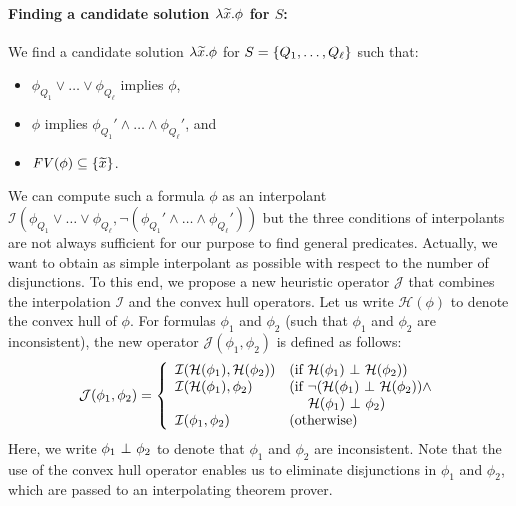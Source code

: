 \paragraph{Finding a candidate solution \(\lambda \widetilde{x}.\phi\) for \(S\):}
We find a candidate solution \(\lambda \widetilde{x}.\phi\) for \(S = 
\{{Q_1,\dots,Q_{\ell}}\}\) such that:
\begin{itemize}
\item \(\phi_{Q_1} \lor \dots \lor \phi_{Q_{\ell}}\) implies \(\phi\),
\item \(\phi\) implies \(\phi_{Q_1}' \land \dots \land \phi_{Q_{\ell}}'\), and
\item \(\mathit{FV}({\phi}) \subseteq \{{\widetilde{x}}\}\).
\end{itemize}
We can compute such a formula \(\phi\) as an interpolant 
\(\mathcal{I}(\phi_{Q_1} \lor \dots \lor \phi_{Q_{\ell}},\neg 
(\phi_{Q_1}' \land \dots \land \phi_{Q_{\ell}}'))\) but the three 
conditions of interpolants are not always sufficient for our purpose to 
find general predicates.  Actually, we want to obtain as simple 
interpolant as possible with respect to the number of disjunctions.
To this end, we propose a new heuristic operator \(\mathcal{J}\) that
combines the interpolation \(\mathcal{I}\) and the convex hull operators.
 Let us write \(\mathcal{H}(\phi)\) to denote the convex hull of \(\phi\).
 For formulas \(\phi_1\) and \(\phi_2\) (such that \(\phi_1\) and
\(\phi_2\) are inconsistent), the new operator
\(\mathcal{J}(\phi_1,\phi_2)\) is defined as follows:
\begin{eqnarray*}
\mathcal{J}(\phi_1,\phi_2) =
\left\{
\begin{array}{ll}
\mathcal{I}(\mathcal{H}(\phi_1),\mathcal{H}(\phi_2)) & (\mbox{if~}\mathcal{H}(\phi_1) \ \bot\  \mathcal{H}(\phi_2)) \\
\mathcal{I}(\mathcal{H}(\phi_1),\phi_2) & (\mbox{if~}\neg (\mathcal{H}(\phi_1) \ \bot\  \mathcal{H}(\phi_2)) \land \\
&\ \quad \mathcal{H}(\phi_1) \ \bot\  \phi_2) \\
\mathcal{I}(\phi_1,\phi_2) & (\mbox{otherwise})
\end{array}
\right.
\end{eqnarray*}
Here, we write \(\phi_1 \ \bot\  \phi_2\) to denote that \(\phi_1\) and
\(\phi_2\) are inconsistent.  Note that the use of the convex hull
operator enables us to eliminate disjunctions in \(\phi_1\) and
\(\phi_2\), which are passed to an interpolating theorem prover.
